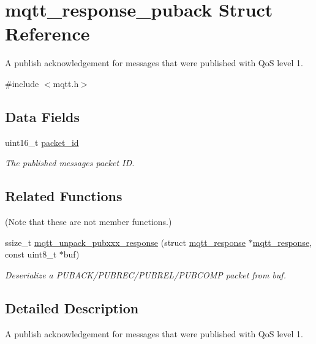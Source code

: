 \hypertarget{structmqtt__response__puback}{}\section{mqtt\+\_\+response\+\_\+puback Struct Reference}
\label{structmqtt__response__puback}


A publish acknowledgement for messages that were published with QoS level 1.  




{\ttfamily \#include $<$mqtt.\+h$>$}

\subsection*{Data Fields}
\begin{DoxyCompactItemize}
\item 
uint16\+\_\+t \hyperlink{structmqtt__response__puback_aa9dcbb98f6c22b0d497a89d193515b31}{packet\+\_\+id}\hypertarget{structmqtt__response__puback_aa9dcbb98f6c22b0d497a89d193515b31}{}\label{structmqtt__response__puback_aa9dcbb98f6c22b0d497a89d193515b31}

\begin{DoxyCompactList}\small\item\em The published messages packet ID. \end{DoxyCompactList}\end{DoxyCompactItemize}
\subsection*{Related Functions}
(Note that these are not member functions.) \begin{DoxyCompactItemize}
\item 
ssize\+\_\+t \hyperlink{group__unpackers_ga8c9b9bb3aab29bfca1408b9e5c5d4a01}{mqtt\+\_\+unpack\+\_\+pubxxx\+\_\+response} (struct \hyperlink{structmqtt__response}{mqtt\+\_\+response} $\ast$\hyperlink{structmqtt__response}{mqtt\+\_\+response}, const uint8\+\_\+t $\ast$buf)
\begin{DoxyCompactList}\small\item\em Deserialize a P\+U\+B\+A\+C\+K/\+P\+U\+B\+R\+E\+C/\+P\+U\+B\+R\+E\+L/\+P\+U\+B\+C\+O\+MP packet from {\ttfamily buf}. \end{DoxyCompactList}\end{DoxyCompactItemize}


\subsection{Detailed Description}
A publish acknowledgement for messages that were published with QoS level 1. 

